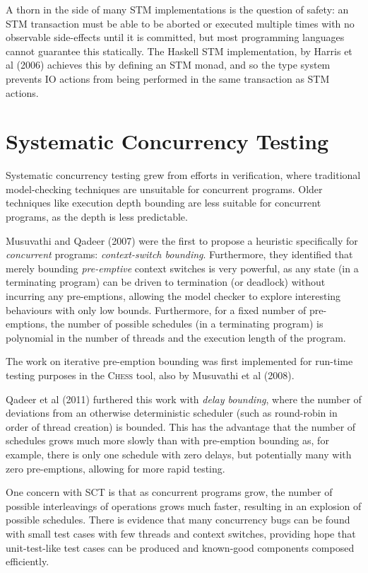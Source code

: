 A thorn in the side of many STM implementations is the question of
safety: an STM transaction must be able to be aborted or executed
multiple times with no observable side-effects until it is committed,
but most programming languages cannot guarantee this statically. The
Haskell STM implementation, by Harris et al (2006)\nocite{haskellstm}
achieves this by defining an STM monad, and so the type system
prevents IO actions from being performed in the same transaction as
STM actions.

\section{Systematic Concurrency Testing}
\label{sec:litrev-sct}

Systematic concurrency testing grew from efforts in
verification\cite{pbound}, where traditional model-checking techniques
are unsuitable for concurrent programs. Older techniques like
execution depth bounding are less suitable for concurrent programs, as
the depth is less predictable.

Musuvathi and Qadeer (2007) were the first to propose a heuristic
specifically for \textit{concurrent} programs: \textit{context-switch
  bounding}. Furthermore, they identified that merely bounding
\textit{pre-emptive} context switches is very powerful, as any state
(in a terminating program) can be driven to termination (or deadlock)
without incurring any pre-emptions, allowing the model checker to
explore interesting behaviours with only low bounds. Furthermore, for
a fixed number of pre-emptions, the number of possible schedules (in a
terminating program) is polynomial in the number of threads and the
execution length of the program.

The work on iterative pre-emption bounding was first implemented for
run-time testing purposes in the \textsc{Chess}\cite{heisenbugs} tool,
also by Musuvathi et al (2008).

Qadeer et al (2011) furthered this work with \textit{delay bounding},
where the number of deviations from an otherwise deterministic
scheduler (such as round-robin in order of thread creation) is
bounded. This has the advantage that the number of schedules grows
much more slowly than with pre-emption bounding as, for example, there
is only one schedule with zero delays, but potentially many with zero
pre-emptions, allowing for more rapid testing.

One concern with SCT is that as concurrent programs grow, the number
of possible interleavings of operations grows much faster, resulting
in an explosion of possible schedules. There is evidence that many
concurrency bugs can be found with small test cases with few threads
and context switches\cite{pbound, dbound, empirical}, providing hope
that unit-test-like test cases can be produced and known-good
components composed efficiently.


